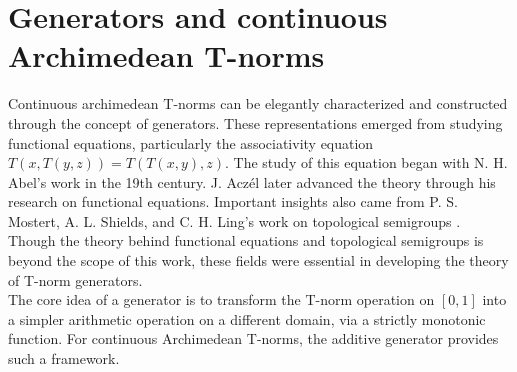 
\section{Generators and continuous Archimedean T-norms}
\label{app:generators_tnorms}
Continuous archimedean T-norms can be elegantly characterized and constructed through the concept of generators. 
These representations emerged from studying functional equations, particularly the associativity equation
 $T(x, T(y,z)) = T(T(x,y),z)$. The study of this equation began with N. H. Abel's work in the 19th century. J. Aczél later advanced the theory through his research on functional equations. Important insights also came from P. S. Mostert, A. L. Shields, and C. H. Ling's work on topological semigroups \cite[Sec.~5.1]{Klement2000}. Though the theory behind functional equations and topological semigroups is beyond the scope of this work, these fields were essential in developing the theory of T-norm generators.\\

The core idea of a generator is to transform the T-norm operation on $[0,1]$ into a simpler arithmetic operation on a different domain, via a strictly monotonic function. For continuous Archimedean T-norms, the additive generator provides such a framework.

